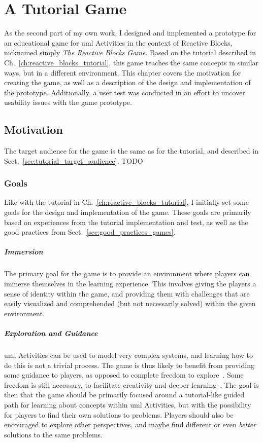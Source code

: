 \chapter{A Tutorial Game}
\label{ch:tutorial_game}
As the second part of my own work, I designed and implemented a prototype for an educational game for \gls{uml} Activities in the context of Reactive Blocks, nicknamed simply \emph{The Reactive Blocks Game}. Based on the tutorial described in Ch.~\ref{ch:reactive_blocks_tutorial}, this game teaches the same concepts in similar ways, but in a different environment. This chapter covers the motivation for creating the game, as well as a description of the design and implementation of the prototype. Additionally, a user test was conducted in an effort to uncover usability issues with the game prototype.

\section{Motivation}
\label{sec:game_motivation}
The target audience for the game is the same as for the tutorial, and described in Sect.~\ref{sec:tutorial_target_audience}.
TODO


\subsection{Goals}
\label{sec:game_goals}
Like with the tutorial in Ch.~\ref{ch:reactive_blocks_tutorial}, I initially set some goals for the design and implementation of the game. These goals are primarily based on experiences from the tutorial implementation and test, as well as the good practices from Sect.~\ref{sec:good_practices_games}.

\paragraph{Immersion} The primary goal for the game is to provide an environment where players can immerse themselves in the learning experience. This involves giving the players a sense of identity within the game, and providing them with challenges that are easily visualized and comprehended (but not necessarily solved) within the given environment.

\paragraph{Exploration and Guidance} \gls{uml} Activities can be used to model very complex systems, and learning how to do this is not a trivial process. The game is thus likely to benefit from providing some guidance to players, as opposed to complete freedom to explore~\cite{andersen:tutorials_impact}. Some freedom is still necessary, to facilitate creativity and deeper learning~\cite{bonawitz:double_edged_pedagogy}. The goal is then that the game should be primarily focused around a tutorial-like guided path for learning about concepts within \gls{uml} Activities, but with the possibility for players to find their own solutions to problems. Players should also be encouraged to explore other perspectives, and maybe find different or even \emph{better} solutions to the same problems.

